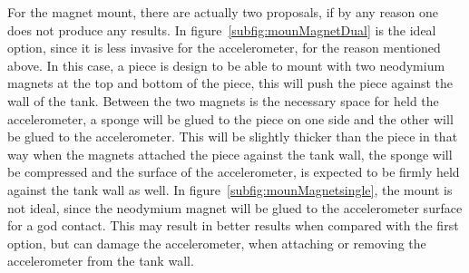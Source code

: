 For the magnet mount, there are actually two proposals, if by any reason one does not produce any results. In figure~\ref{subfig:mounMagnetDual} is the ideal option, since it is less invasive for the accelerometer, for the reason mentioned above. In this case, a piece is design to be able to mount with two neodymium magnets at the top and bottom of the piece, this will push the piece against the wall of the tank. Between the two magnets is the necessary space for held the accelerometer, a sponge will be glued to the piece on one side and the other will be glued to the accelerometer. This will be slightly thicker than the piece in that way when the magnets attached the piece against the tank wall, the sponge will be compressed and the surface of the accelerometer, is expected to be firmly held against the tank wall as well. In figure~\ref{subfig:mounMagnetsingle}, the mount is not ideal, since the neodymium magnet will be glued to the accelerometer surface for a god contact. This may result in better results when compared with the first option, but can damage the accelerometer, when attaching or removing the accelerometer from the tank wall.
